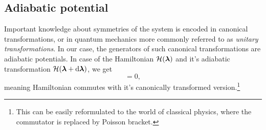\subsection{Adiabatic potential}
Important knowledge about symmetries of the system is encoded in canonical transformations, or in quantum mechanics more commonly referred to as \emph{unitary transformations}. In our case, the generators of such canonical transformations are adiabatic potentials. In case of the Hamiltonian $\mathcal{H}({\bm\lambda})$ and it's adiabatic transformation $\mathcal{H}({\bm\lambda}+\mathrm{d} {\bm\lambda})$, we get
\begin{equation}
    [\HH(\llambda),\HH(\llambda+\d \llambda)]=0,
\end{equation}
meaning Hamiltonian commutes with it's canonically transformed version.\footnote{This can be easily reformulated to the world of classical physics, where the commutator is replaced by Poisson bracket.}


